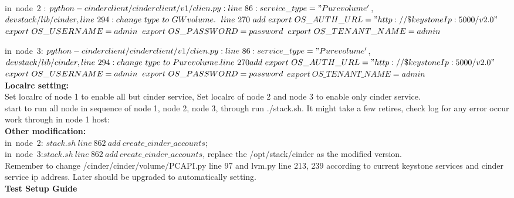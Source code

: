 \documentclass[10pt]{report}
\begin{document}
			in\ node\ 2 : $python-cinderclient/cinderclient/v1/clien.py:line\ 86: service\_type = "Purevolume'$,\\
			$ devstack/lib/cinder, line\ 294: change\ type\ to\ GWvolume.\\$
			$line\ 270\ add\ export\  OS\_AUTH\_URL="http://\$keystoneIp:5000/v2.0" \\$
			$export\ OS\_USERNAME=admin \\$
			$export\ OS\_PASSWORD=password \\$
			$export\ OS\_TENANT\_NAME=admin\\$
			
			in\  node\ 3:  $python-cinderclient/cinderclient/v1/clien.py: line\ 86: service\_type = "Purevolume'$,\\
			$ devstack/lib/cinder, line\ 294: change\ type\ to\ Purevolume. \\
			line\ 270 add\ export\  OS\_AUTH\_URL="http://\$keystoneIp:5000/v2.0" \\$
			$export\ OS\_USERNAME=admin \\$
			$export\ OS\_PASSWORD=password \\$
			$export\ OS\_TENANT\_NAME=admin$\\
			\textbf{Localrc setting:}\\
			Set localrc of node 1 to enable all but cinder service, Set localrc of node 2 and node 3 to enable only cinder service.\\
			start to run all node in sequence of node 1, node 2, node 3, through run ./stack.sh.	It might take a few retires, check log for any error occur\\	
			work through in node 1 host:\\
			\textbf{Other modification:}\\
			in\ node\ 2: $stack.sh\ line\ 862\ add\  create\_cinder\_accounts;$\\
			in\ node\ 3:$stack.sh\ line\ 862\ add\ create\_cinder\_accounts$, replace the /opt/stack/cinder as the modified version. \\
			Remember to change /cinder/cinder/volume/PCAPI.py line 97 and lvm.py line 213, 239
			according to current keystone services and cinder service ip address. Later should be upgraded to automatically setting.\\			
			\textbf{Test Setup Guide} \\
		
\end{document}
